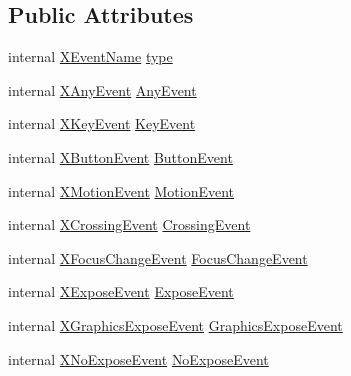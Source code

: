 \subsection*{Public Attributes}
\begin{DoxyCompactItemize}
\item 
internal \hyperlink{namespace_tao_1_1_platform_1_1_x11_aff81ed5b8778e1ea8e872861dff9f146}{XEventName} \hyperlink{struct_tao_1_1_platform_1_1_x11_1_1_x_event_a62992004c644f8452a2a05bb6b127f0d}{type}
\item 
internal \hyperlink{struct_tao_1_1_platform_1_1_x11_1_1_x_any_event}{XAnyEvent} \hyperlink{struct_tao_1_1_platform_1_1_x11_1_1_x_event_aee6f3fdea0dfef478445ec9733ab49ee}{AnyEvent}
\item 
internal \hyperlink{struct_tao_1_1_platform_1_1_x11_1_1_x_key_event}{XKeyEvent} \hyperlink{struct_tao_1_1_platform_1_1_x11_1_1_x_event_a718790023eb2ebda04b74a00f5a6c33c}{KeyEvent}
\item 
internal \hyperlink{struct_tao_1_1_platform_1_1_x11_1_1_x_button_event}{XButtonEvent} \hyperlink{struct_tao_1_1_platform_1_1_x11_1_1_x_event_ac846ecdffbd752f194088619b1ea4fa7}{ButtonEvent}
\item 
internal \hyperlink{struct_tao_1_1_platform_1_1_x11_1_1_x_motion_event}{XMotionEvent} \hyperlink{struct_tao_1_1_platform_1_1_x11_1_1_x_event_a199f966c56a47165d4b6e93d5b12a3ea}{MotionEvent}
\item 
internal \hyperlink{struct_tao_1_1_platform_1_1_x11_1_1_x_crossing_event}{XCrossingEvent} \hyperlink{struct_tao_1_1_platform_1_1_x11_1_1_x_event_a0ec40c6f34177e4089a3d87f33958f78}{CrossingEvent}
\item 
internal \hyperlink{struct_tao_1_1_platform_1_1_x11_1_1_x_focus_change_event}{XFocusChangeEvent} \hyperlink{struct_tao_1_1_platform_1_1_x11_1_1_x_event_ae686be127f5428eb05151d21008cfaa2}{FocusChangeEvent}
\item 
internal \hyperlink{struct_tao_1_1_platform_1_1_x11_1_1_x_expose_event}{XExposeEvent} \hyperlink{struct_tao_1_1_platform_1_1_x11_1_1_x_event_a1160d1070843400d74aedb35a000f78b}{ExposeEvent}
\item 
internal \hyperlink{struct_tao_1_1_platform_1_1_x11_1_1_x_graphics_expose_event}{XGraphicsExposeEvent} \hyperlink{struct_tao_1_1_platform_1_1_x11_1_1_x_event_abf0056b4d1484f65059980cef53c2964}{GraphicsExposeEvent}
\item 
internal \hyperlink{struct_tao_1_1_platform_1_1_x11_1_1_x_no_expose_event}{XNoExposeEvent} \hyperlink{struct_tao_1_1_platform_1_1_x11_1_1_x_event_a4f164739054a04d890682f8895d334c7}{NoExposeEvent}

\end{DoxyCompactItemize}

